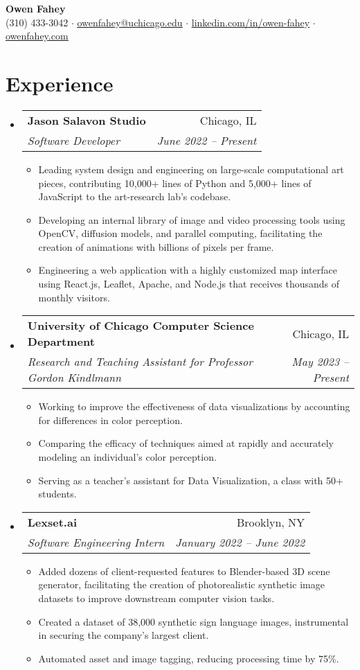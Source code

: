 \documentclass[letterpaper,11pt]{article}
\makeatletter
\newcommand{\resumeItem}[1]{
  \item\small{
    {#1 \vspace{-2pt}}
  }
}
\newcommand{\resumeSubheading}[4]{
  \vspace{-2pt}\item
    \begin{tabular*}{0.97\textwidth}[t]{l@{\extracolsep{\fill}}r}
      \textbf{#1} & #2 \\
      \textit{\small#3} & \textit{\small #4} \\
    \end{tabular*}\vspace{-7pt}
}
\newcommand{\resumeSubHeadingListStart}{\begin{itemize}[leftmargin=0.125in, label={}]}
\newcommand{\resumeSubHeadingListEnd}{\end{itemize}}
\newcommand{\resumeItemListStart}{\begin{itemize}[leftmargin=0.185in]
}
\newcommand{\resumeItemListEnd}{\end{itemize}\vspace{-5pt}}
\makeatother
\begin{document}
\begin{center}
  \textbf{\Huge 
Owen Fahey} \\
  \small (310) 433-3042 $\cdot$
  \href{mailto:owenfahey@uchicago.edu}{\underline{owenfahey@uchicago.edu}} $\cdot$
  \href{https://www.linkedin.com/in/owen-fahey}{\underline{linkedin.com/in/owen-fahey}} $\cdot$
  \href{https://owenfahey.com}{\underline{owenfahey.com}}
\end{center}

  
\section{Experience}
  \resumeSubHeadingListStart
    \resumeSubheading
      {Jason Salavon Studio}
      {Chicago, IL}
      {Software Developer}
      {June 2022 -- Present}
      \resumeItemListStart
        \resumeItem{Leading system design and engineering on large-scale computational art pieces, contributing 10,000+ lines of Python and 5,000+ lines of JavaScript to the art-research lab's codebase.}
        \resumeItem{Developing an internal library of image and video processing tools using OpenCV, diffusion models, and parallel computing, facilitating the creation of animations with billions of pixels per frame.}
        \resumeItem{Engineering a web application with a highly customized map interface using React.js, Leaflet, Apache, and Node.js that receives thousands of monthly visitors.}
      \resumeItemListEnd
    \resumeSubheading
      {University of Chicago Computer Science Department}
      {Chicago, IL}
      {Research and Teaching Assistant for Professor Gordon Kindlmann}
      {May 2023 -- Present}
      \resumeItemListStart
        \resumeItem{Working to improve the effectiveness of data visualizations by accounting for differences in color perception.}
        \resumeItem{Comparing the efficacy of techniques aimed at rapidly and accurately modeling an individual's color perception.}
        \resumeItem{Serving as a teacher's assistant for Data Visualization, a class with 50+ students.}
      \resumeItemListEnd
    \resumeSubheading
      {Lexset.ai}
      {Brooklyn, NY}
      {Software Engineering Intern}
      {January 2022 -- June 2022}
      \resumeItemListStart
        \resumeItem{Added dozens of client-requested features to Blender-based 3D scene generator, facilitating the creation of photorealistic synthetic image datasets to improve downstream computer vision tasks.} \resumeItem{
        Created a dataset of 38,000 synthetic sign language images, instrumental in securing the company's largest client.}
        \resumeItem{Automated asset and image tagging, reducing processing time by 75\%.}
      \resumeItemListEnd
  \resumeSubHeadingListEnd
\end{document}
